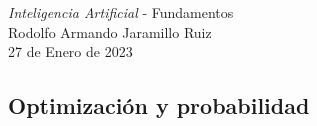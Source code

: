 \documentclass[14pt,a4paper]{report}
\begin{document}
\newcommand{\commentedbox}[2]{%
  \mbox{
    \begin{tabular}[t]{@{}c@{}}
    $\boxed{\displaystyle#1}$\\
    #2
    \end{tabular}%
  }%
}
\pagestyle{fancy}
\Large{\textit{Inteligencia Artificial} - Fundamentos}\\
\normalsize
Rodolfo Armando Jaramillo Ruiz\\
27 de Enero de 2023\\
\subsection*{Optimización y probabilidad}
\end{document}
